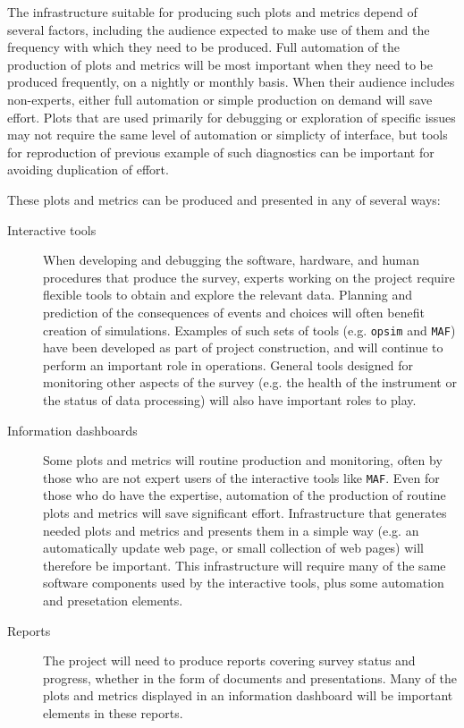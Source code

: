 The infrastructure suitable for producing such plots and metrics depend of several factors, including the audience expected to make use of them and the frequency with which they need to be produced.
Full automation of the production of plots and metrics will be most important when they need to be produced frequently, on a nightly or monthly basis.
When their audience includes non-experts, either full automation or simple production on demand will save effort.
Plots that are used primarily for debugging or exploration of specific issues may not require the same level of automation or simplicty of interface, but tools for reproduction of previous example of such diagnostics can be important for avoiding duplication of effort.

These plots and metrics can be produced and presented in any of several ways:

\begin{description}
\item[{Interactive tools}] When developing and debugging the software, hardware, and human procedures that produce the survey, experts working on the project require flexible tools to obtain and explore the relevant data. Planning and prediction of the consequences of events and choices will often benefit creation of simulations. Examples of such sets of tools (e.g. \texttt{opsim} and \texttt{MAF}) have been developed as part of project construction, and will continue to perform an important role in operations. General tools designed for monitoring other aspects of the survey (e.g. the health of the instrument or the status of data processing) will also have important roles to play.
\item[{Information dashboards}] Some plots and metrics will routine production and monitoring, often by those who are not expert users of the interactive tools like \texttt{MAF}. Even for those who do have the expertise, automation of the production of routine plots and metrics will save significant effort. Infrastructure that generates needed plots and metrics and presents them in a simple way (e.g. an automatically update web page, or small collection of web pages) will therefore be important. This infrastructure will require many of the same software components used by the interactive tools, plus some automation and presetation elements.
\item[{Reports}] The project will need to produce reports covering survey status and progress, whether in the form of documents and presentations. Many of the plots and metrics displayed in an information dashboard will be important elements in these reports.
\end{description}

